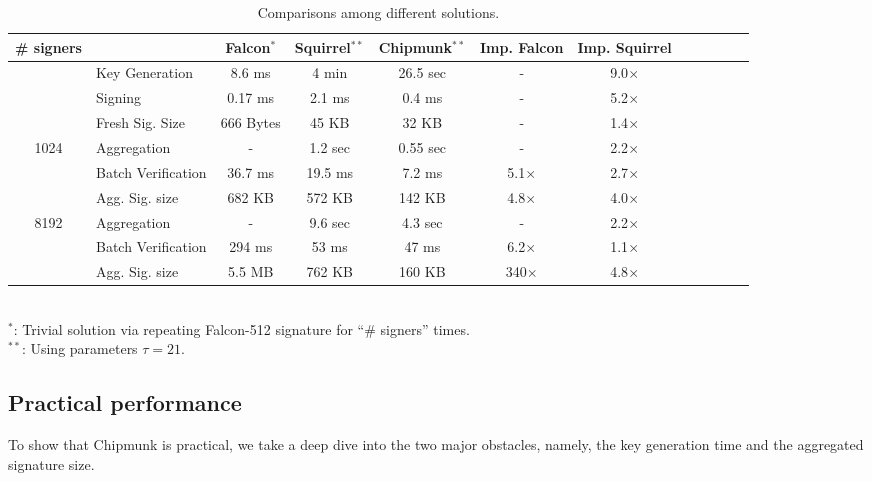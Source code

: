 \begin{table}\centering
  \begin{tabular}{|c||l|c|c|c||c|c|c|c||c|c|c|}\hline
    \# signers      &                 & Falcon$^{*}$& Squirrel$^{**}$  & Chipmunk$^{**}$  & Imp. Falcon & Imp. Squirrel \\\hline\hline
    \multirow{2}{*}{} 
                    & Key Generation  & 8.6 ms      & 4 min     & 26.5 sec  &     -       & 9.0$\times$ \\\cline{2-7}
                    & Signing         & 0.17 ms     & 2.1 ms    & 0.4 ms    &     -       & 5.2$\times$ \\\cline{2-7}
                    &Fresh Sig. Size  & 666 Bytes   & 45 KB     & 32 KB     &     -       & 1.4$\times$ \\\hline\hline
    \multirow{3}{*}{1024}                
                    &Aggregation      & -           & 1.2 sec   & 0.55 sec  &     -       & 2.2$\times$ \\\cline{2-7}
                    &Batch Verification    
                                      & 36.7 ms     & 19.5 ms   & 7.2 ms    & 5.1$\times$ & 2.7$\times$ \\\cline{2-7}
                    
                    &Agg. Sig. size   & 682 KB      & 572 KB    & 142 KB    & 4.8$\times$ & 4.0$\times$ \\\hline\hline
    \multirow{3}{*}{8192}                
                    &Aggregation      & -           & 9.6 sec   & 4.3 sec   &     -       & 2.2$\times$ \\\cline{2-7}
                    &Batch Verification    
                                      & 294 ms      & 53  ms    &  47 ms    & 6.2$\times$ & 1.1$\times$ \\\cline{2-7}
                    &Agg. Sig. size   & 5.5 MB      & 762 KB    & 160 KB    & 340$\times$ & 4.8$\times$ \\\hline
\end{tabular}\\
  $^{*}$: Trivial solution via repeating Falcon-512 signature for ``\# signers'' times.\\
  $^{**}$: Using parameters $\tau=21$.
  \caption{Comparisons among different solutions.}
\end{table}

\subsection{Practical performance}
To show that Chipmunk is practical, 
we take a deep dive into the two major obstacles, namely, the key generation time and the aggregated signature size.

